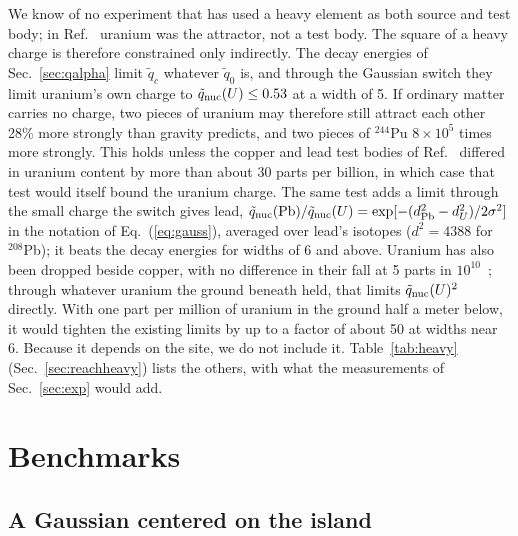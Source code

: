 \documentclass[aps,prd,onecolumn,superscriptaddress,floatfix,nofootinbib]{revtex4-2}
\newcommand{\qt}{\tilde q}
\newcommand{\Pu}[1]{$^{#1}$Pu}
\newcommand{\nuc}[2]{$^{#1}$#2}
\begin{document}
We know of no experiment that has used a heavy element as both source and test body; in Ref.~\cite{Smith2000}
uranium was the attractor, not a test body. The square of a heavy charge is therefore constrained only indirectly.
The decay energies of Sec.~\ref{sec:qalpha} limit $\qt_c$ whatever $\qt_0$ is, and through the Gaussian switch they
limit uranium's own charge to $\qt_{\rm nuc}(U)\le0.53$ at a width of 5. If ordinary matter carries no charge, two
pieces of uranium may therefore still attract each other 28\% more strongly than gravity predicts, and two pieces
of \Pu{244} $8\times10^{5}$ times more strongly. This holds unless the copper and lead test bodies of
Ref.~\cite{Smith2000} differed in uranium content by more than about 30 parts per billion, in which case that test
would itself bound the uranium charge. The same test adds a limit through the small charge the switch gives lead,
$\qt_{\rm nuc}({\rm Pb})/\qt_{\rm nuc}(U)=\exp[-(d_{\rm Pb}^2-d_U^2)/2\sigma^2]$ in the notation of
Eq.~(\ref{eq:gauss}), averaged over lead's isotopes ($d^2=4388$ for \nuc{208}{Pb}); it beats the decay energies for
widths of 6 and above. Uranium has also been dropped beside copper, with no difference in their fall at 5 parts in
$10^{10}$~\cite{Niebauer1987}; through whatever uranium the ground beneath held, that limits $\qt_{\rm nuc}(U)^2$
directly. With one part per million of uranium in the ground half a meter below, it would tighten the existing limits
by up to a factor of about 50 at widths near 6. Because it depends on the site, we do not include it.
Table~\ref{tab:heavy} (Sec.~\ref{sec:reachheavy}) lists the others, with what the measurements of Sec.~\ref{sec:exp}
would add.

\FloatBarrier

\section{Benchmarks}\label{sec:bench}

\subsection{A Gaussian centered on the island}
\end{document}
